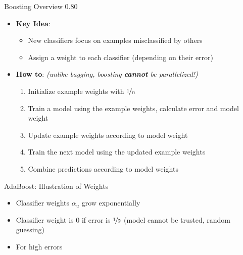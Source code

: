 \begin{frame}{Boosting Overview}{}
{	}{0.80}{
		\vspace*{-6mm}
		\begin{itemize}
			\item \textbf{Key Idea}:
			\begin{itemize}
				\item New classifiers focus on examples misclassified by others
				\item Assign a weight to each classifier (depending on their error)
			\end{itemize}
			\item \textbf{How to}:
				\footnotesize \textit{(unlike bagging, boosting \textbf{cannot} be parallelized!)} \normalsize
			\begin{enumerate}
				\item Initialize example weights with $\nicefrac{1}{n}$
				\item Train a model using the example weights, calculate error and model weight
				\item Update example weights according to model weight
				\item Train the next model using the updated example weights
				\item Combine predictions according to model weights
			\end{enumerate}
		\end{itemize}
	}
\end{frame}


\begin{frame}[plain]{}{}
	
\end{frame}


\begin{frame}{AdaBoost: Illustration of Weights}{}\optional
	\vspace*{2mm}
	
	\footnotesize
	\begin{itemize}
		\item Classifier weights $\alpha_u$ grow exponentially
		\item Classifier weight is 0 if error is $\nicefrac{1}{2}$ (model cannot be trusted, random guessing)
		\item For high errors 
	\end{itemize}
\end{frame}


